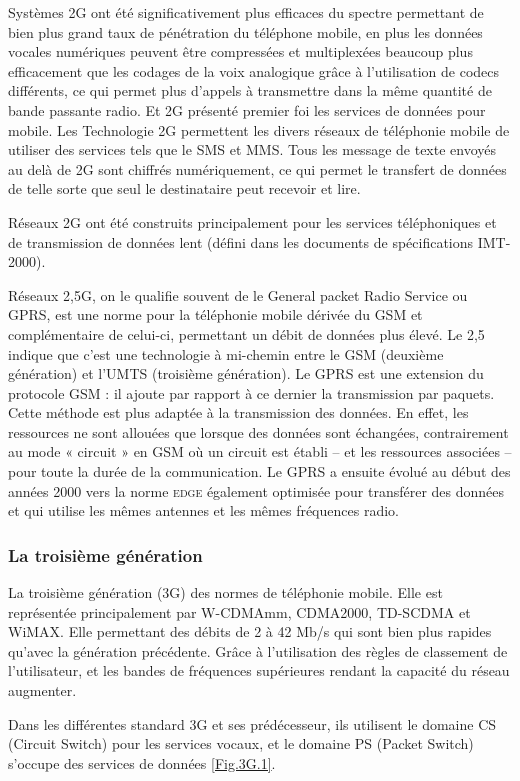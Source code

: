 Systèmes 2G ont été significativement plus efficaces du spectre permettant de bien plus grand taux de pénétration du téléphone mobile, en plus les données vocales numériques peuvent être compressées et multiplexées beaucoup plus efficacement que les codages de la voix analogique grâce à l'utilisation de codecs différents, ce qui permet plus d'appels à transmettre dans la même quantité de bande passante radio. Et 2G présenté premier foi les services de données pour mobile. Les Technologie 2G permettent les divers réseaux de téléphonie mobile de utiliser des services tels que le SMS et MMS. Tous les message de texte envoyés au delà de 2G sont chiffrés numériquement, ce qui permet le transfert de données de telle sorte que seul le destinataire peut recevoir et lire.   

Réseaux 2G ont été construits principalement pour les services téléphoniques et de transmission de données lent (défini dans les documents de spécifications IMT-2000).

Réseaux \textsf{2,5G}, on le qualifie souvent de le General packet Radio Service ou GPRS, est une norme pour la téléphonie mobile dérivée du GSM et complémentaire de celui-ci, permettant un débit de données plus élevé. Le 2,5 indique que c'est une technologie à mi-chemin entre le GSM (deuxième génération) et l'UMTS (troisième génération). Le GPRS est une extension du protocole GSM : il ajoute par rapport à ce dernier la transmission par paquets. Cette méthode est plus adaptée à la transmission des données. En effet, les ressources ne sont allouées que lorsque des données sont échangées, contrairement au mode « circuit » en GSM où un circuit est établi – et les ressources associées – pour toute la durée de la communication. Le GPRS a ensuite évolué au début des années 2000 vers la norme \textsc{edge} également optimisée pour transférer des données et qui utilise les mêmes antennes et les mêmes fréquences radio.
\subsubsection{La troisième génération}
La troisième génération (3G) des normes de téléphonie mobile. Elle est représentée principalement par W-CDMAmm, CDMA2000, TD-SCDMA et WiMAX. Elle permettant des débits de 2 à 42 Mb/s qui sont bien plus rapides qu'avec la génération précédente. Grâce à l'utilisation des règles de classement de l'utilisateur, et les  bandes de fréquences supérieures rendant la capacité du réseau augmenter.

Dans les différentes standard  3G et ses prédécesseur, ils utilisent le domaine CS (Circuit Switch)  pour les services vocaux, et le domaine PS (Packet Switch) s'occupe des services de données \ref{Fig.3G.1}.
